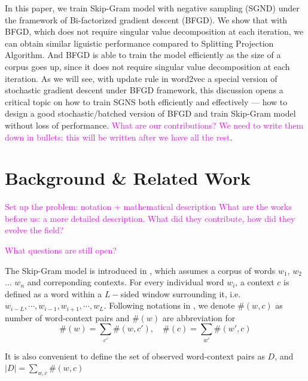 \documentclass[letterpaper]{article} %
\begin{document}
In this paper, we train Skip-Gram model with negative sampling (SGND) under the framework of Bi-factorized gradient descent (BFGD). We show that with BFGD, which does not require singular value decomposition at each iteration, we can obtain similar liguistic performance compared to Splitting Projection Algorithm. And BFGD is able to train the model efficiently as the size of a corpus goes up, since it does not require singular value decomposition at each iteration.
As we will see, with update rule in word2vec a special version of stochastic gradient descent under BFGD framework, this discussion opens a critical topic on how to train SGNS both efficiently and effectively --- how to design a good stochastic/batched version of BFGD and train Skip-Gram model without loss of performance.
\textcolor{magenta}{What are our contributions? We need to write them down in bullets; this will be written after we have all the rest}.

\section{Background \& Related Work}
\textcolor{magenta}{Set up the problem: notation + mathematical description}
\textcolor{magenta}{What are the works before us: a more detailed description. What did they contribute, how did they evolve the field?}

\textcolor{magenta}{What questions are still open?}


The Skip-Gram model is introduced in \cite{NIPS2013_5021}, which assumes a corpus of words $w_1$, $w_2$ ... $w_n$ and correponding contexts. For every individual word $w_i$, a context $c$ is defined as a word within a $L-$sided window surrounding it, i.e. $w_{i-L},\cdots, w_{i-1},w_{i+1},\cdots,w_L$. Following notations in \cite{levy2014neural}, we denote $\#(w,c)$ as number of word-context pairs and $\#(w)$ are abbreviation for
\begin{equation}
\#(w)=\sum_{c'}\#(w,c'),\quad\#(c)=\sum_{w'}\#(w',c)	
\end{equation}

It is also convenient to define the set of observed word-context pairs as $D$, and $|D|=\sum_{w,c}\#(w,c)$
\end{document}
